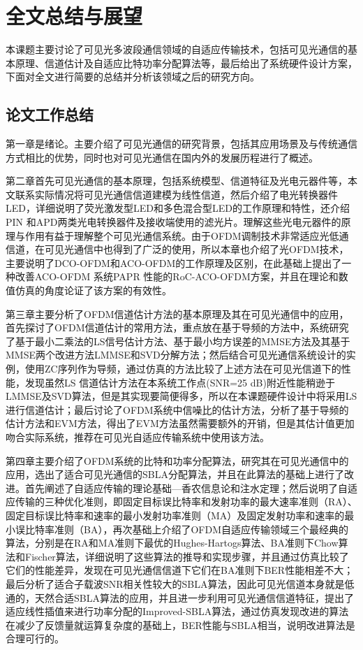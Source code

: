 \chapter{全文总结与展望}
本课题主要讨论了可见光多波段通信领域的自适应传输技术，包括可见光通信的基本原理、信道估计及自适应比特功率分配算法等，最后给出了系统硬件设计方案，下面对全文进行简要的总结并分析该领域之后的研究方向。
\section{论文工作总结}
第一章是绪论。主要介绍了可见光通信的研究背景，包括其应用场景及与传统通信方式相比的优势，同时也对可见光通信在国内外的发展历程进行了概述。

第二章首先可见光通信的基本原理，包括系统模型、信道特征及光电元器件等，本文联系实际情况将可见光通信信道建模为线性信道，然后介绍了电光转换器件LED，详细说明了荧光激发型LED和多色混合型LED的工作原理和特性，还介绍PIN 和APD两类光电转换器件及接收端使用的滤光片。理解这些光电元器件的原理与作用有益于理解整个可见光通信系统。由于OFDM调制技术非常适应光低通信道，在可见光通信中也得到了广泛的使用，所以本章也介绍了光OFDM技术，主要说明了DCO-OFDM和ACO-OFDM的工作原理及区别，在此基础上提出了一种改善ACO-OFDM 系统PAPR 性能的RoC-ACO-OFDM方案，并且在理论和数值仿真的角度论证了该方案的有效性。

第三章主要分析了OFDM信道估计方法的基本原理及其在可见光通信中的应用，首先探讨了OFDM信道估计的常用方法，重点放在基于导频的方法中，系统研究了基于最小二乘法的LS信号估计方法、基于最小均方误差的MMSE方法及其基于MMSE两个改进方法LMMSE和SVD分解方法；然后结合可见光通信系统设计的实例，使用ZC序列作为导频，通过仿真的方法比较了上述方法在可见光信道下的性能，发现虽然LS 信道估计方法在本系统工作点(SNR=25 dB)附近性能稍逊于LMMSE及SVD算法，但是其实现要简便得多，所以在本课题硬件设计中将采用LS进行信道估计；最后讨论了OFDM系统中信噪比的估计方法，分析了基于导频的估计方法和EVM方法，得出了EVM方法虽然需要额外的开销，但是其估计值更加吻合实际系统，推荐在可见光自适应传输系统中使用该方法。

第四章主要介绍了OFDM系统的比特和功率分配算法，研究其在可见光通信中的应用，选出了适合可见光通信的SBLA分配算法，并且在此算法的基础上进行了改进。首先阐述了自适应传输的理论基础—香农信息论和注水定理；然后说明了自适应传输的三种优化准则，即固定目标误比特率和发射功率的最大速率准则（RA）、固定目标误比特率和速率的最小发射功率准则（MA）及固定发射功率和速率的最小误比特率准则（BA），再次基础上介绍了OFDM自适应传输领域三个最经典的算法，分别是在RA和MA准则下最优的Hughes-Hartogs算法、BA准则下Chow算法和Fischer算法，详细说明了这些算法的推导和实现步骤，并且通过仿真比较了它们的性能差异，发现在可见光通信信道下它们在BA准则下BER性能相差不大；最后分析了适合子载波SNR相关性较大的SBLA算法，因此可见光信道本身就是低通的，天然合适SBLA算法的应用，并且进一步利用可见光通信信道特征，提出了适应线性插值来进行功率分配的Improved-SBLA算法，通过仿真发现改进的算法在减少了反馈量就运算复杂度的基础上，BER性能与SBLA相当，说明改进算法是合理可行的。

